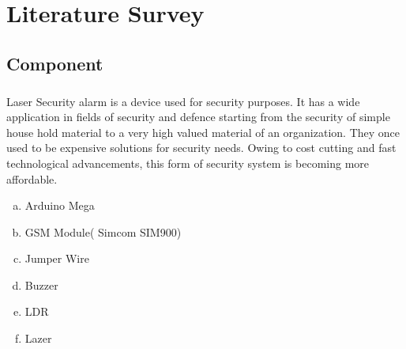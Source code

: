 \chapter{Literature Survey}
\section{Component}
\paragraph{}Laser Security alarm is a device used for security purposes. It has a wide application in fields of security and defence starting from the security of simple house hold material to a very high valued material of an organization. They once used to be expensive solutions for security needs. Owing to cost cutting and fast technological advancements, this form of security system is becoming more affordable. 
\begin{enumerate}[a. ]
 \item Arduino Mega
 \item GSM Module( Simcom SIM900)
 \item Jumper Wire
 \item Buzzer
 \item LDR
 \item Lazer
\end{enumerate}